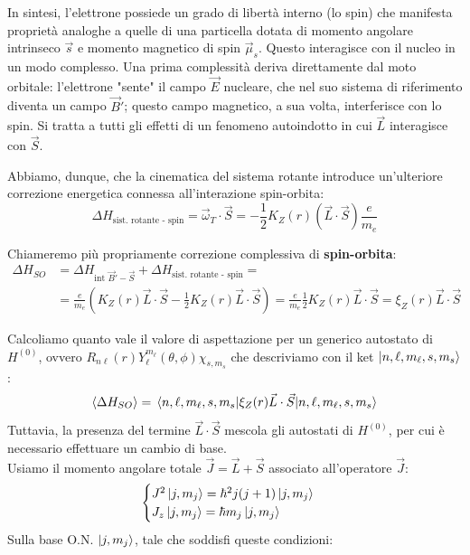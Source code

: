In sintesi, l'elettrone possiede un grado di libertà interno (lo spin) che manifesta proprietà analoghe a quelle di una particella dotata di momento angolare intrinseco \(\vec{s}\) e momento magnetico di spin \(\vec{\mu}_s\). 
Questo interagisce con il nucleo in un modo complesso. Una prima complessità deriva direttamente dal moto orbitale: l'elettrone "sente" il campo \(\vec{E}\) nucleare, che nel suo sistema di riferimento diventa un campo \(\vec{B}'\); questo campo magnetico, a sua volta, interferisce con lo spin. 
Si tratta a tutti gli effetti di un fenomeno autoindotto in cui \(\vec{L}\) interagisce con \(\vec{S}\).

Abbiamo, dunque, che la cinematica del sistema rotante introduce un'ulteriore correzione energetica connessa all'interazione spin-orbita:
\begin{equation}
    \Delta H_{\text{sist. rotante - spin}} = \vec{\omega}_T \cdot \vec{S} = - \frac{1}{2} K_Z(r) \left(\vec{L} \cdot \vec{S}\right) \frac{e}{m_e}
\end{equation}

Chiameremo più propriamente correzione complessiva di \textbf{spin-orbita}:
\begin{align}
    \Delta H_{SO} &= \Delta H_{\text{int } \vec{B}'-\vec{S}} + \Delta H_{\text{sist. rotante - spin}} = \nonumber \\
    &= \frac{e}{m_e} \left( K_Z(r) \vec{L} \cdot \vec{S} - \frac{1}{2} K_Z(r) \vec{L} \cdot \vec{S} \right) =\frac{e}{m_e} \frac{1}{2} K_Z(r) \vec{L} \cdot \vec{S} = \xi_Z(r) \vec{L} \cdot \vec{S}
\end{align}

Calcoliamo quanto vale il valore di aspettazione per un generico autostato di \(H^{(0)}\), ovvero \(R_{n\ell}(r) Y_\ell^{m_\ell}(\theta, \phi) \chi_{s, m_s}\) che descriviamo con il ket \(\ket{n, \ell, m_\ell, s, m_s}\):
\begin{equation*}
    \expval{\Delta H_{SO}} = \mel{n, \ell, m_\ell, s, m_s}{\xi_Z(r)\vec{L} \cdot \vec{S}}{n, \ell, m_\ell, s, m_s}
\end{equation*}
Tuttavia, la presenza del termine \(\vec{L} \cdot \vec{S}\) mescola gli autostati di \(H^{(0)}\), per cui è necessario effettuare un cambio di base. \\
Usiamo il momento angolare totale \(\vec{J} = \vec{L} + \vec{S}\) associato all'operatore \(\vec{J}\):
\begin{equation}
    \begin{cases}
        J^2 \ket{j, m_j} = \hbar^2 j(j+1) \ket{j, m_j} \\
        J_z \ket{j, m_j} = \hbar m_j \ket{j, m_j}
    \end{cases}
\end{equation}
Sulla base O.N. \(\ket{j,m_j}\), tale che soddisfi queste condizioni:

